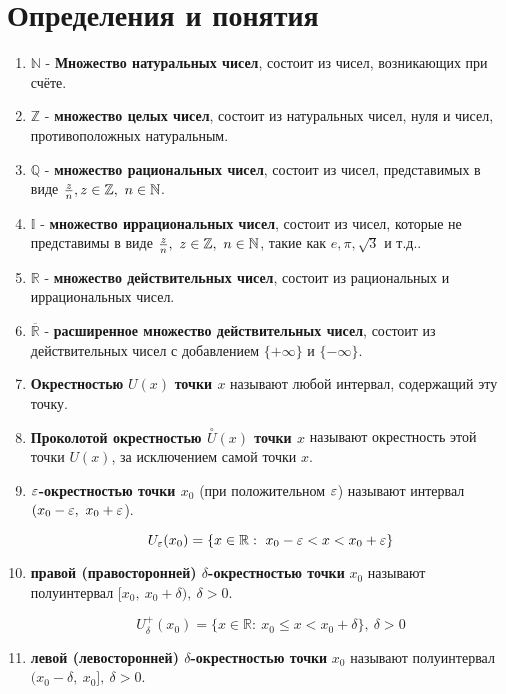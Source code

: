 

\renewcommand{\copyright}{fiixii, pluttan}
    
    
\section{Определения и понятия}
\begin{enumerate}

\item $\mathbb{N}$ - \textbf{Множество натуральных чисел}, состоит из чисел, возникающих при счёте.
\item $\mathbb{Z}$ - \textbf{множество целых чисел}, состоит из натуральных чисел, нуля и чисел, противоположных натуральным.
\item $\mathbb{Q}$ - \textbf{множество рациональных чисел}, состоит из чисел, представимых в виде ${\Large\frac{z}{n}}, z \in \mathbb{Z}, \ n \in \mathbb{N}$.
\item $\mathbb{I}$ - \textbf{множество иррациональных чисел}, состоит из чисел, которые не представимы в виде ${\Large\frac{z}{n}}, \ z \in \mathbb{Z}, \ n \in \mathbb{N}$, такие как $e, \pi, \sqrt{3}$ и т.д..
\item $\mathbb{R}$ - \textbf{множество действительных чисел}, состоит из рациональных и иррациональных чисел.
\item $\overline{\mathbb{R}}$ - \textbf{расширенное множество действительных чисел}, состоит из действительных чисел с добавлением $\{+\infty\}$ и $\{-\infty\}$.
\item \textbf{Окрестностью} $U(x)$ \textbf{точки $x$} называют любой интервал, содержащий эту точку.
\item \textbf{Проколотой окрестностью $
\overset{\circ}U(x)$ точки $x$} называют окрестность этой точки $U(x)$, за исключением самой точки $x$.
\item \textbf{${\large\varepsilon}$-окрестностью точки $x_0$} (при положительном ${\large\varepsilon}$) называют интервал $(x_0-{\large\varepsilon}, \ x_0+{\large\varepsilon}$).

$$U_{\large\varepsilon}(x_0) = \{x \in \mathbb{R}: \ x_0 - {\large\varepsilon} < x < x_0 + {\large\varepsilon}\}$$
\item \textbf{правой (правосторонней) $\delta$-окрестностью точки} $x_0$ называют полуинтервал $[x_0,\ x_0 + \delta), \ \delta > 0$.

$$U^+_{\delta}(x_0) = \{x \in \mathbb{R}: \ x_0 \leqslant x < x_0 + {\delta}\}, \ \delta > 0$$
\item \textbf{левой (левосторонней) $\delta$-окрестностью точки} $x_0$ называют полуинтервал $(x_0 - \delta,\ x_0], \ \delta > 0$.


\end{enumerate}
